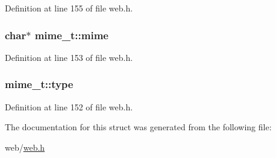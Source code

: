 Definition at line 155 of file web.\+h.

\subsubsection[{\texorpdfstring{mime}{mime}}]{\setlength{\rightskip}{0pt plus 5cm}char$\ast$ mime\+\_\+t\+::mime}\hypertarget{structmime__t_ad796d16eaee60d7435bff66b2e9b8a8d}{}\label{structmime__t_ad796d16eaee60d7435bff66b2e9b8a8d}


Definition at line 153 of file web.\+h.

\subsubsection[{\texorpdfstring{type}{type}}]{ mime\+\_\+t\+::type}\hypertarget{structmime__t_ae69826dcfd475d65fa0fe8a1574bb3af}{}\label{structmime__t_ae69826dcfd475d65fa0fe8a1574bb3af}


Definition at line 152 of file web.\+h.



The documentation for this struct was generated from the following file\+:\begin{DoxyCompactItemize}
\item 
web/\hyperlink{web_8h}{web.\+h}\end{DoxyCompactItemize}
